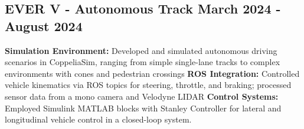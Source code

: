 \subsection*{
  EVER V - Autonomous Track
  \hspace*{\fill}
  \dateformat March 2024 - August 2024
}
\begin{tasks}
  \task \textbf{Simulation Environment:} Developed and simulated autonomous driving scenarios in CoppeliaSim, ranging from simple single-lane tracks to complex environments with cones and pedestrian crossings
  \task \textbf{ROS Integration:} Controlled vehicle kinematics via ROS topics for steering, throttle, and braking; processed sensor data from a mono camera and Velodyne LIDAR
  \task \textbf{Control Systems:} Employed Simulink MATLAB blocks with Stanley Controller for lateral and longitudinal vehicle control in a closed-loop system.
\end{tasks}
%
%
%
%
%
%
%
%
%
%
